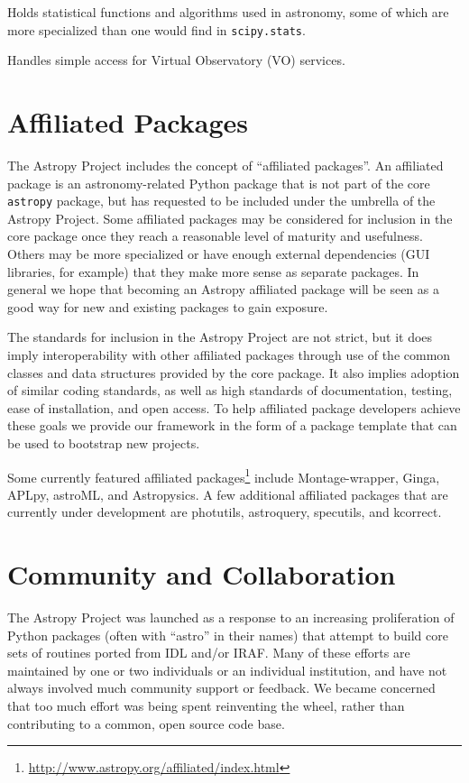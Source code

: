 \documentclass[11pt,twoside]{article}
\begin{document}
Holds statistical functions and algorithms used in astronomy, some of which are
more specialized than one would find in \texttt{scipy.stats}.


Handles simple access for Virtual Observatory (VO) services.

\section{Affiliated Packages}

The Astropy Project includes the concept of ``affiliated packages''.  An
affiliated package is an astronomy-related Python package that is not part of
the core \texttt{astropy} package, but has requested to be included under the
umbrella of the Astropy Project.  Some affiliated packages may be considered
for inclusion in the core package once they reach a reasonable level of
maturity and usefulness.  Others may be more specialized or have enough
external dependencies (GUI libraries, for example) that they make more sense as
separate packages.  In general we hope that becoming an Astropy affiliated
package will be seen as a good way for new and existing packages to gain
exposure.

The standards for inclusion in the Astropy Project are not strict, but it does
imply interoperability with other affiliated packages through use of the common
classes and data structures provided by the core package.  It also implies
adoption of similar coding standards, as well as high standards of
documentation, testing, ease of installation, and open access.  To help
affiliated package developers achieve these goals we provide our framework in
the form of a package template that can be used to bootstrap new projects.

Some currently featured affiliated
packages\footnote{\url{http://www.astropy.org/affiliated/index.html}} include
Montage-wrapper, Ginga, APLpy, astroML, and Astropysics.  A few additional
affiliated packages that are currently under development are photutils,
astroquery, specutils, and kcorrect.

\section{Community and Collaboration}

The Astropy Project was launched as a response to an increasing proliferation
of Python packages (often with ``astro'' in their names) that attempt to build
core sets of routines ported from IDL and/or IRAF.  Many of these efforts are
maintained by one or two individuals or an individual institution, and have not
always involved much community support or feedback.  We became concerned that
too much effort was being spent reinventing the wheel, rather than contributing
to a common, open source code base.
\end{document}
